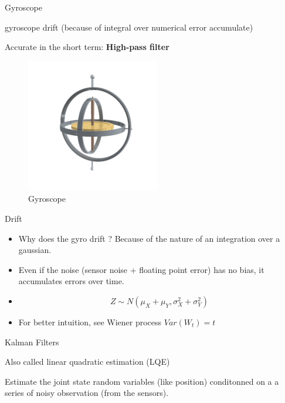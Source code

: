 \begin{frame}{Gyroscope}

gyroscope drift (because of integral over numerical error accumulate)

Accurate in the short term: \textbf{High-pass filter}

\begin{figure}
\centering
\includegraphics{gyro.gif}
\caption{Gyroscope}
\end{figure}

\end{frame}

\begin{frame}{Drift}

\begin{itemize}
\tightlist
\item
  Why does the gyro drift ? Because of the nature of an integration over
  a gaussian.
\item
  Even if the noise (sensor noise + floating point error) has no bias,
  it accumulates errors over time.
\item
  \[Z \sim N(\mu_X + \mu_Y, \sigma_X^2 + \sigma_Y^2)\]
\item
  For better intuition, see Wiener process \(Var(W_t) = t\)
\end{itemize}

\end{frame}

\begin{frame}{Kalman Filters}

Also called linear quadratic estimation (LQE)

Estimate the joint state random variables (like position) conditonned on
a a series of noisy observation (from the sensors).

\end{frame}

